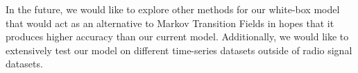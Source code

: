 \documentclass{turabian-thesis}
\begin{document}
In the future, we would like to explore other methods for our white-box model that would act as an alternative to Markov Transition Fields in hopes that it produces higher accuracy than our current model. Additionally, we would like to extensively test our model on different time-series datasets outside of radio signal datasets.

%          
%          
%          
%          
%          
%          




 
\end{document}
